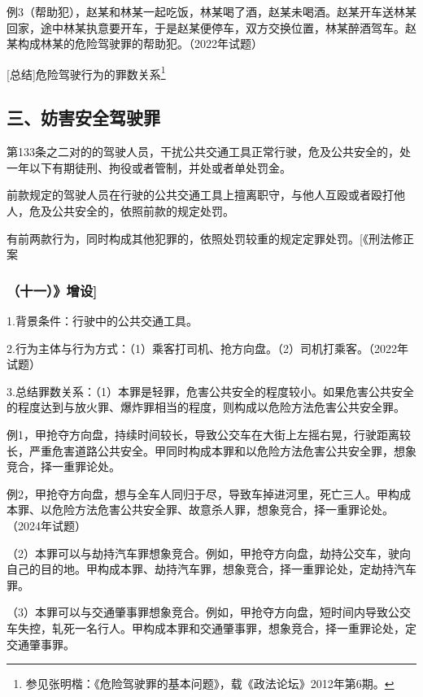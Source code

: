 例3（帮助犯），赵某和林某一起吃饭，林某喝了酒，赵某未喝酒。赵某开车送林某回家，途中林某执意要开车，于是赵某便停车，双方交换位置，林某醉酒驾车。赵某构成林某的危险驾驶罪的帮助犯。（2022年试题）

[总结]危险驾驶行为的罪数关系\footnote{参见张明楷：《危险驾驶罪的基本问题》，载《政法论坛》2012年第6期。}


\subsection*{三、妨害安全驾驶罪}

第133条之二对的的驾驶人员，干扰公共交通工具正常行驶，危及公共安全的，处一年以下有期徒刑、拘役或者管制，并处或者单处罚金。

前款规定的驾驶人员在行驶的公共交通工具上擅离职守，与他人互殴或者殴打他人，危及公共安全的，依照前款的规定处罚。

有前两款行为，同时构成其他犯罪的，依照处罚较重的规定定罪处罚。[《刑法修正案

\subsubsection*{（十一）》增设]}

1.背景条件：行驶中的公共交通工具。

2.行为主体与行为方式：（1）乘客打司机、抢方向盘。（2）司机打乘客。（2022年试题）

3.总结罪数关系：（1）本罪是轻罪，危害公共安全的程度较小。如果危害公共安全的程度达到与放火罪、爆炸罪相当的程度，则构成以危险方法危害公共安全罪。

例1，甲抢夺方向盘，持续时间较长，导致公交车在大街上左摇右晃，行驶距离较长，严重危害道路公共安全。甲同时构成本罪和以危险方法危害公共安全罪，想象竞合，择一重罪论处。

例2，甲抢夺方向盘，想与全车人同归于尽，导致车掉进河里，死亡三人。甲构成本罪、以危险方法危害公共安全罪、故意杀人罪，想象竞合，择一重罪论处。（2024年试题）

（2）本罪可以与劫持汽车罪想象竞合。例如，甲抢夺方向盘，劫持公交车，驶向自己的目的地。甲构成本罪、劫持汽车罪，想象竞合，择一重罪论处，定劫持汽车罪。

（3）本罪可以与交通肇事罪想象竞合。例如，甲抢夺方向盘，短时间内导致公交车失控，轧死一名行人。甲构成本罪和交通肇事罪，想象竞合，择一重罪论处，定交通肇事罪。

